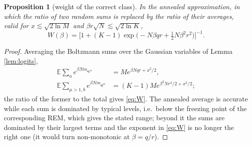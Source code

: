 \documentclass[11pt,a4paper]{article}
\newtheorem{proposition}{Proposition}
\newcommand{\e}{\bm{\eta}}
\newcommand{\E}{\mathbb{E}}
\begin{document}
\begin{proposition}[weight of the correct class]\label{prop:W}
In the annealed approximation, in which the ratio of two random sums is replaced by the ratio of their averages, valid for $x\lesssim\sqrt{2\ln M}$ and $\beta r\sqrt N\lesssim\sqrt{2\ln K}$,
\begin{equation}
W(\beta)=\Big[1+(K-1)\exp\!\big(-N\beta qr+\tfrac12N\beta^2r^2\big)\Big]^{-1}.
\label{eq:W}
\end{equation}
\end{proposition}
\begin{proof}
Averaging the Boltzmann sums over the Gaussian variables of Lemma \ref{lem:logits},
\begin{align*}
\E\sum_a e^{\beta Nm_{\e^{1a}}}&=Me^{\beta Nqr+x^2/2},\\
\E\sum_{\mu>1,b}e^{\beta Nm_{\e^{\mu b}}}&=(K-1)Me^{\beta^2Nr^2/2+x^2/2};
\end{align*}
the ratio of the former to the total gives \eqref{eq:W}. The annealed average is accurate while each sum is dominated by typical levels, i.e.\ below the freezing point of the corresponding REM, which gives the stated range; beyond it the sums are dominated by their largest terms and the exponent in \eqref{eq:W} is no longer the right one (it would turn non-monotonic at $\beta=q/r$).
\end{proof}
\end{document}
